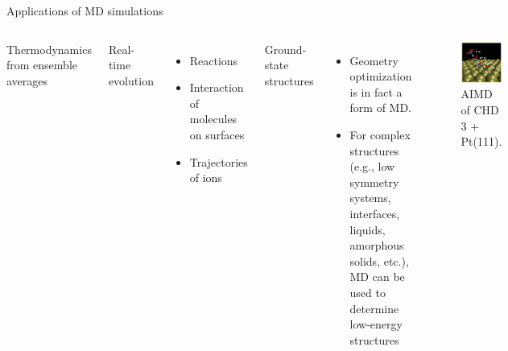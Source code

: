 \documentclass[aspectratio=169]{beamer}
\begin{document}
\begin{frame}{Applications of MD simulations}
\begin{columns}
Thermodynamics from ensemble averages

Real-time evolution
\begin{itemize}
    \item Reactions
    \item Interaction of molecules on surfaces
    \item Trajectories of ions
\end{itemize}

Ground-state structures
\begin{itemize}
    \item Geometry optimization is in fact a form of MD.
    \item For complex structures (e.g., low symmetry systems, interfaces, liquids, amorphous solids, etc.), MD can be used to determine low-energy structures
\end{itemize}
\begin{figure}
    \centering
    \includegraphics[width=\linewidth]{lectures/figures/13_CHD_Pt.png}
    \caption{AIMD of CHD 3 + Pt(111).\cite{nattinoInitioMolecularDynamics2014}}
    
\end{figure} 
\end{columns} 

\end{frame} 
\end{document}
